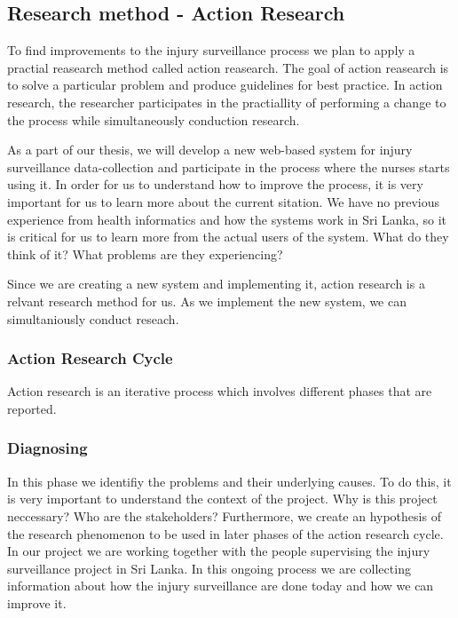\documentclass[UKenglish, 12pt]{article}
\begin{document}
\subsection*{Research method - Action Research}
To find improvements to the injury surveillance process we plan to apply a practial reasearch method called action reasearch. The goal of action reasearch is to solve a particular problem and produce guidelines for best practice\cite{denscombe}. In action research, the researcher participates in the practiallity of performing a change to the process while simultaneously conduction research.

As a part of our thesis, we will develop a new web-based system for injury surveillance data-collection and participate in the process where the nurses starts using it. In order for us to understand how to improve the process, it is very important for us to learn more about the current sitation. We have no previous experience from health informatics and how the systems work in Sri Lanka, so it is critical for us to learn more from the actual users of the system.  What do they think of it? What problems are they experiencing?

Since we are creating a new system and implementing it, action research is a relvant research method for us. As we implement the new system, we can simultaniously conduct reseach.


\subsubsection*{Action Research Cycle}
Action research is an iterative process which involves different phases that are reported.

\subsubsection*{Diagnosing} In this phase we identifiy the problems and their underlying causes. To do this, it is very important to understand the context of the project. Why is this project neccessary? Who are the stakeholders? Furthermore,  we create an hypothesis of the research phenomenon to be used in later phases of the action research cycle. \\

In our project we are working together with the people supervising the injury surveillance project in Sri Lanka. In this ongoing process we are collecting information about how the injury surveillance are done today and how we can improve it. 
\end{document}
